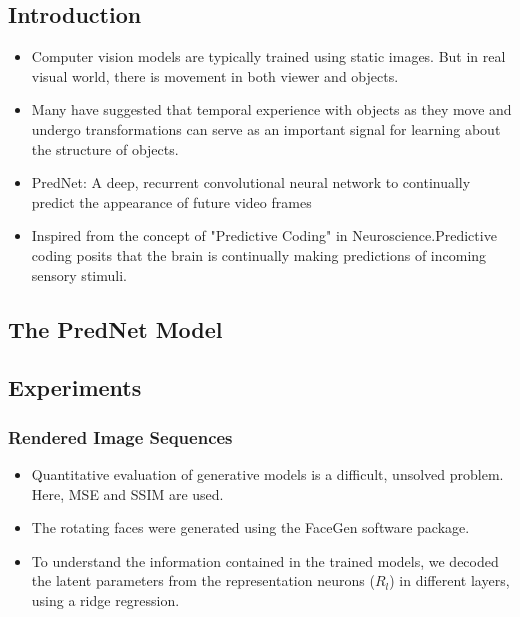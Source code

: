 \documentclass{article}
\begin{document}
    \subsection{Introduction}\label{subsec:Deep_Predictive_Coding_Networks_for_Video_Prediction_and_Unsupervised_Learning:introduction}
    \begin{itemize}
        \item Computer vision models are typically trained using static images.
        But in real visual world, there is movement in both viewer and objects.
        \item Many have suggested that temporal experience with objects as they move and undergo transformations can serve as an important signal for learning about the structure of objects.
        \item PredNet: A deep, recurrent convolutional neural network to continually predict the appearance of future video frames
        \item Inspired from the concept of "Predictive Coding" in Neuroscience.Predictive coding posits that the brain is continually making predictions of incoming sensory stimuli.
    \end{itemize}

    \subsection{The PredNet Model}\label{subsec:Deep_Predictive_Coding_Networks_for_Video_Prediction_and_Unsupervised_Learning:the-prednet-model}

    \subsection{Experiments}\label{subsec:Deep_Predictive_Coding_Networks_for_Video_Prediction_and_Unsupervised_Learning:experiments}

    \subsubsection{Rendered Image Sequences}\label{subsubsec:Deep_Predictive_Coding_Networks_for_Video_Prediction_and_Unsupervised_Learning:rendered-image-sequences}
    \begin{itemize}
        \item Quantitative evaluation of generative models is a difficult, unsolved problem.
        Here, MSE and SSIM are used.
        \item The rotating faces were generated using the FaceGen software package.
        \item To understand the information contained in the trained models, we decoded the latent parameters from the representation neurons ($R_l$) in different layers, using a ridge regression.
    \end{itemize}
\end{document}
